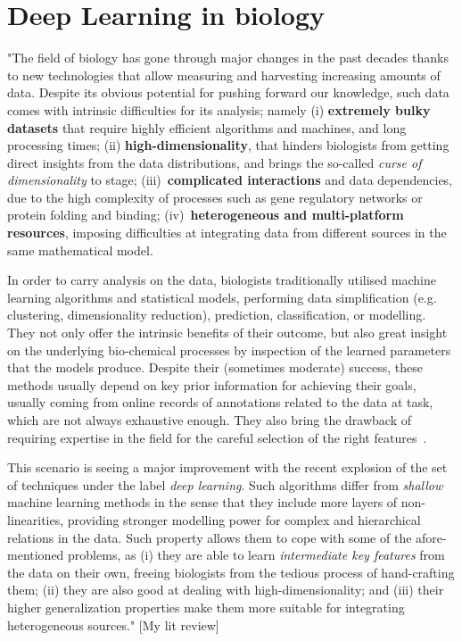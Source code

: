 \section{Deep Learning in biology}

"The field of biology has gone through major changes in the past decades thanks to new technologies that allow measuring and harvesting increasing amounts of data. Despite its obvious potential for pushing forward our knowledge, such data comes with intrinsic difficulties for its analysis; namely (i) \textbf{extremely bulky datasets} that require highly efficient algorithms and machines, and long processing times; (ii) \textbf{high-dimensionality}, that hinders biologists from getting direct insights from the data distributions, and brings the so-called \textit{curse of dimensionality} to stage; (iii)~\textbf{complicated interactions} and data dependencies, due to the high complexity of processes such as gene regulatory networks or protein folding and binding; (iv)~\textbf{heterogeneous and multi-platform resources}, imposing difficulties at integrating data from different sources in the same mathematical model.

In order to carry analysis on the data, biologists traditionally utilised machine learning algorithms and statistical models, performing data simplification (e.g. clustering, dimensionality reduction), prediction, classification, or modelling. They not only offer the intrinsic benefits of their outcome, but also great insight on the underlying bio-chemical processes by inspection of the learned parameters that the models produce. Despite their (sometimes moderate) success, these methods usually depend on key prior information for achieving their goals, usually coming from online records of annotations related to the data at task, which are not always exhaustive enough. They also bring the drawback of requiring expertise in the field for the careful selection of the right features~\cite{Libbrecht2015}.

This scenario is seeing a major improvement with the recent explosion of the set of techniques under the label \textit{deep learning}. Such algorithms differ from \textit{shallow} machine learning methods in the sense that they include more layers of non-linearities, providing stronger modelling power for complex and hierarchical relations in the data. Such property allows them to cope with some of the afore-mentioned problems, as (i) they are able to learn \textit{intermediate key features} from the data on their own, freeing biologists from the tedious process of hand-crafting them; (ii) they are also good at dealing with high-dimensionality; and (iii) their higher generalization properties make them more suitable for integrating heterogeneous sources." [My lit review]

